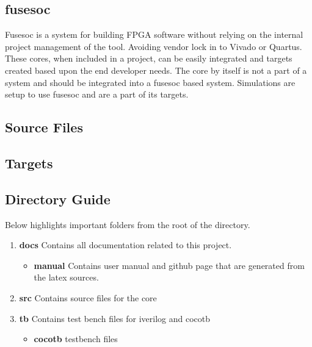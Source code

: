 \subsection{fusesoc}
\par
Fusesoc is a system for building FPGA software without relying on the internal project management of the tool. Avoiding vendor lock in to Vivado or Quartus.
These cores, when included in a project, can be easily integrated and targets created based upon the end developer needs. The core by itself is not a part of
a system and should be integrated into a fusesoc based system. Simulations are setup to use fusesoc and are a part of its targets.

\subsection{Source Files}



\subsection{Targets}



\subsection{Directory Guide}

\par
Below highlights important folders from the root of the directory.

\begin{enumerate}
  \item \textbf{docs} Contains all documentation related to this project.
    \begin{itemize}
      \item \textbf{manual} Contains user manual and github page that are generated from the latex sources.
    \end{itemize}
  \item \textbf{src} Contains source files for the core
  \item \textbf{tb} Contains test bench files for iverilog and cocotb
    \begin{itemize}
      \item \textbf{cocotb} testbench files
    \end{itemize}
\end{enumerate}

